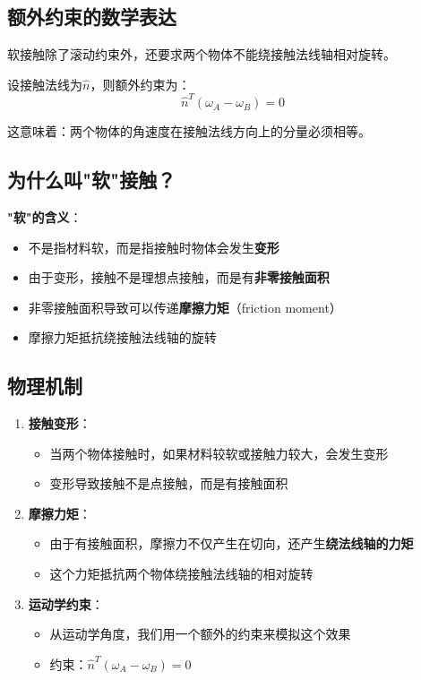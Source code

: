 \documentclass[12pt,a4paper]{article}
\begin{document}
\subsection{额外约束的数学表达}

软接触除了滚动约束外，还要求两个物体不能绕接触法线轴相对旋转。

设接触法线为$\hat{n}$，则额外约束为：
\begin{equation}
\hat{n}^T (\omega_A - \omega_B) = 0
\label{eq:soft_contact_constraint}
\end{equation}

这意味着：两个物体的角速度在接触法线方向上的分量必须相等。

\subsection{为什么叫"软"接触？}

\textbf{"软"的含义}：
\begin{itemize}
\item 不是指材料软，而是指接触时物体会发生\textbf{变形}
\item 由于变形，接触不是理想点接触，而是有\textbf{非零接触面积}
\item 非零接触面积导致可以传递\textbf{摩擦力矩}（friction moment）
\item 摩擦力矩抵抗绕接触法线轴的旋转
\end{itemize}

\subsection{物理机制}

\begin{enumerate}
\item \textbf{接触变形}：
  \begin{itemize}
  \item 当两个物体接触时，如果材料较软或接触力较大，会发生变形
  \item 变形导致接触不是点接触，而是有接触面积
  \end{itemize}

\item \textbf{摩擦力矩}：
  \begin{itemize}
  \item 由于有接触面积，摩擦力不仅产生在切向，还产生\textbf{绕法线轴的力矩}
  \item 这个力矩抵抗两个物体绕接触法线轴的相对旋转
  \end{itemize}

\item \textbf{运动学约束}：
  \begin{itemize}
  \item 从运动学角度，我们用一个额外的约束来模拟这个效果
  \item 约束：$\hat{n}^T (\omega_A - \omega_B) = 0$
  \end{itemize}
\end{enumerate}
\end{document}
